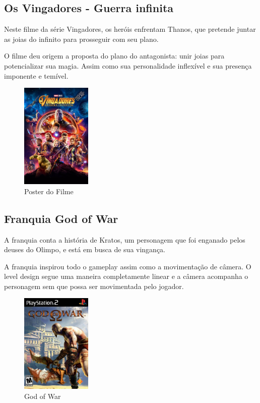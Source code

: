 \subsection{Os Vingadores - Guerra infinita}

Neste filme da série Vingadores, os heróis enfrentam Thanos, que pretende juntar as joias do infinito para prosseguir com seu plano.

O filme deu origem a proposta do plano do antagonista: unir joias para potencializar sua magia. Assim como sua personalidade inflexível e sua presença imponente e temível.

\begin{figure}[!htb] \caption{\label{vingadores}Poster do Filme} \begin{center}
\includegraphics[width=0.3\textwidth]{imagens/vingadores.jpeg} \end{center}
 \end{figure}

\subsection{Franquia God of War}
A franquia conta a história de Kratos, um personagem que foi enganado pelos deuses do Olimpo, e está em busca de sua vingança.

A franquia inspirou todo o gameplay assim como a movimentação de câmera. O level design segue uma maneira completamente linear e a câmera acompanha o personagem sem que possa ser movimentada pelo jogador.

\begin{figure}[!htb] \caption{\label{god_of_war}God of War} \begin{center}
\includegraphics[width=0.3\textwidth]{imagens/GodofWar.jpg} \end{center}
 \end{figure}



